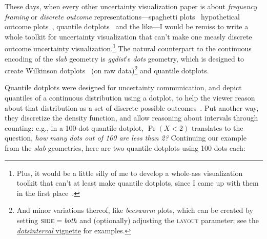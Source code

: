 \documentclass[journal]{vgtc}                     %
\begin{document}
These days, when every other uncertainty visualization paper is about \textit{frequency framing} or \textit{discrete outcome} representations---spaghetti plots~\cite{cox2013visualizing,liu2018visualizing} hypothetical outcome plots~\cite{hullman2015hypothetical,kale2018hypothetical}, quantile dotplots~\cite{kay2016ish,fernandes2018uncertainty} and the like---I would be remiss to write a whole toolkit for uncertainty visualization that can't make one measly discrete outcome uncertainty visualization.\footnote{Plus, it would be a little silly of me to develop a whole-ass visualization toolkit that can't at least make quantile dotplots, since I came up with them in the first place~\cite{kay2016ish}.} The natural counterpart to the continuous encoding of the \textit{slab} geometry is \textit{ggdist}'s \textit{dots} geometry, which is designed to create Wilkinson dotplots~\cite{wilkinson1999dot} (on raw data)\footnote{And minor variations thereof, like \textit{beeswarm} plots, which can be created by setting $\textsc{side} = \textit{both}$ and (optionally) adjusting the \textsc{layout} parameter; see the \href{https://mjskay.github.io/ggdist/articles/dotsinterval.html}{\textit{dotsinterval} vignette} for examples.} and quantile dotplots.

Quantile dotplots were designed for uncertainty communication, and depict quantiles of a continuous distribution using a dotplot, to help the viewer reason about that distribution as a set of discrete possible outcomes~\cite{kay2016ish}. Put another way, they discretize the density function, and allow reasoning about intervals through counting: e.g., in a 100-dot quantile dotplot, $\Pr(X < 2)$ translates to the question, \textit{how many dots out of 100 are less than 2?} Continuing our example from the \textit{slab} geometries, here are two quantile dotplots using 100 dots each:
\end{document}
